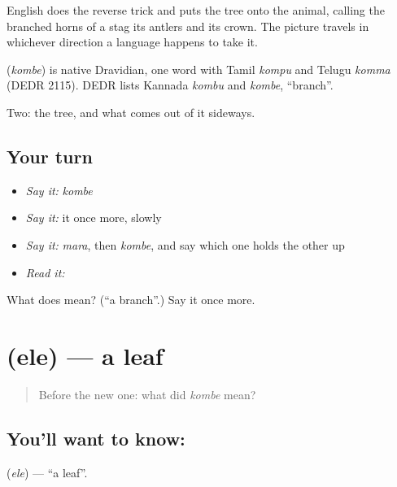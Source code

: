English does the reverse trick and puts the tree onto the animal, calling the branched horns of a stag its antlers and its crown. The picture travels in whichever direction a language happens to take it.

\begin{cousinweb}
\textbf{} (\emph{kombe}) is native Dravidian, one word with Tamil \emph{kompu} and Telugu \emph{komma} (DEDR 2115). DEDR lists Kannada \emph{kombu} and \emph{kombe}, \textquotedblleft{}branch\textquotedblright{}.
\end{cousinweb}

\begin{grammarlens}[title={What you've built}]
Two: the tree, and what comes out of it sideways.
\end{grammarlens}

\subsection*{Your turn}
\begin{itemize}
\raggedright
  \item \emph{Say it:} \emph{kombe}
  \item \emph{Say it:} it once more, slowly
  \item \emph{Say it:} \emph{mara}, then \emph{kombe}, and say which one holds the other up
  \item \emph{Read it:} \textbf{}
\end{itemize}

\begin{tcolorbox}[breakable,colback=teal!4,colframe=teal!35!black,title={Before you move on}]
What does  mean? (\textquotedblleft{}a branch\textquotedblright{}.) Say it once more.
\end{tcolorbox}
\section[\texorpdfstring{\kn{ಎಲೆ} (ele)}{ಎಲೆ (ele)}]{ (ele) — a leaf}

\label{lesson:KA-C54-leaf}



\begin{quote}
Before the new one: what did \emph{kombe} mean?
\end{quote}

\subsection*{You'll want to know: }
\textbf{} (\emph{ele}) — \textquotedblleft{}a leaf\textquotedblright{}.

